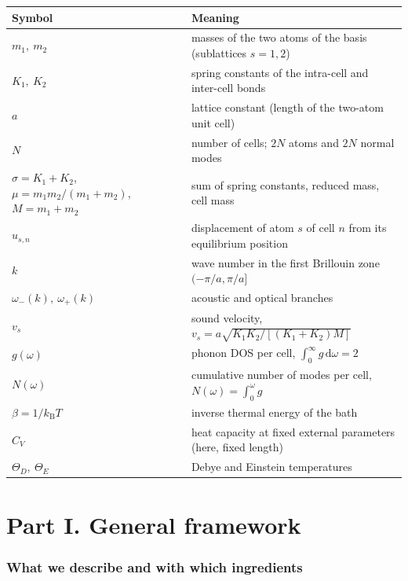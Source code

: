 \documentclass[11pt,a4paper]{article}
\newcommand{\kB}{k_{\mathrm B}}
\newcommand{\dd}{\mathrm{d}}
\newcommand{\vs}{v_{s}}
\begin{document}
\begin{center}
\small
\begin{tabularx}{\textwidth}{@{}l X@{}}
\toprule
Symbol & Meaning \\
\midrule
$m_1,\ m_2$ & masses of the two atoms of the basis (sublattices $s=1,2$)\\
$K_1,\ K_2$ & spring constants of the intra-cell and inter-cell bonds\\
$a$ & lattice constant (length of the two-atom unit cell)\\
$N$ & number of cells; $2N$ atoms and $2N$ normal modes\\
$\sigma=K_1+K_2$,\ $\mu=m_1m_2/(m_1+m_2)$,\ $M=m_1+m_2$ & sum of spring constants, reduced mass, cell mass\\
$u_{s,n}$ & displacement of atom $s$ of cell $n$ from its equilibrium position\\
$k$ & wave number in the first Brillouin zone $(-\pi/a,\pi/a]$\\
$\omega_-(k),\ \omega_+(k)$ & acoustic and optical branches\\
$\vs$ & sound velocity, $\vs=a\sqrt{K_1K_2/[(K_1+K_2)M]}$\\
$g(\omega)$ & phonon DOS per cell, $\int_0^\infty g\,\dd\omega=2$\\
$N(\omega)$ & cumulative number of modes per cell, $N(\omega)=\int_0^\omega g$\\
$\beta=1/\kB T$ & inverse thermal energy of the bath\\
$C_V$ & heat capacity at fixed external parameters (here, fixed length)\\
$\Theta_D,\ \Theta_E$ & Debye and Einstein temperatures\\
\bottomrule
\end{tabularx}
\end{center}

\part*{Part I. General framework}

\section{What we describe and with which ingredients}
\end{document}

